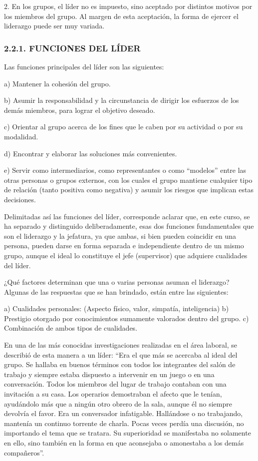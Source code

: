 2. En los grupos, el líder no es impuesto, sino aceptado por distintos motivos por los miembros del grupo. Al margen de esta aceptación, la forma de ejercer el liderazgo puede ser muy variada.

\subsubsection*{2.2.1. FUNCIONES DEL LÍDER}
Las funciones principales del líder son las siguientes:

a) Mantener la cohesión del grupo.



b) Asumir la responsabilidad y la circunstancia de dirigir los esfuerzos de los demás miembros, para lograr el objetivo deseado.

c) Orientar al grupo acerca de los fines que le caben por su actividad o por su modalidad.

d) Encontrar y elaborar las soluciones más convenientes.

e) Servir como intermediarios, como representantes o como “modelos” entre las otras personas o grupos externos, con los cuales el grupo mantiene cualquier tipo de relación (tanto positiva como negativa) y asumir los riesgos que implican estas decisiones.

Delimitadas así las funciones del líder, corresponde aclarar que, en este curso, se ha separado y distinguido deliberadamente, esas dos funciones fundamentales que son el liderazgo y la jefatura, ya que ambas, si bien pueden coincidir en una persona, pueden darse en forma separada e independiente dentro de un mismo grupo, aunque el ideal lo constituye el jefe (supervisor) que adquiere cualidades del líder.

¿Qué factores determinan que una o varias personas asuman el liderazgo? Algunas de las respuestas que se han brindado, están entre las siguientes:

a) Cualidades personales: (Aspecto físico, valor, simpatía, inteligencia) b) Prestigio otorgado por conocimientos sumamente valorados dentro del grupo. c) Combinación de ambos tipos de cualidades.

En una de las más conocidas investigaciones realizadas en el área laboral, se describió de esta manera a un líder: “Era el que más se acercaba al ideal del grupo. Se hallaba en buenos términos con todos los integrantes del salón de trabajo y siempre estaba dispuesto a intervenir en un juego o en una conversación. Todos los miembros del lugar de trabajo contaban con una invitación a su casa. Los operarios demostraban el afecto que le tenían, ayudándolo más que a ningún otro obrero de la sala, aunque él no siempre devolvía el favor. Era un conversador infatigable. Hallándose o no trabajando, mantenía un continuo torrente de charla. Pocas veces perdía una discusión, no importando el tema que se tratara. Su superioridad se manifestaba no solamente en ello, sino también en la forma en que aconsejaba o amonestaba a los demás compañeros”.

